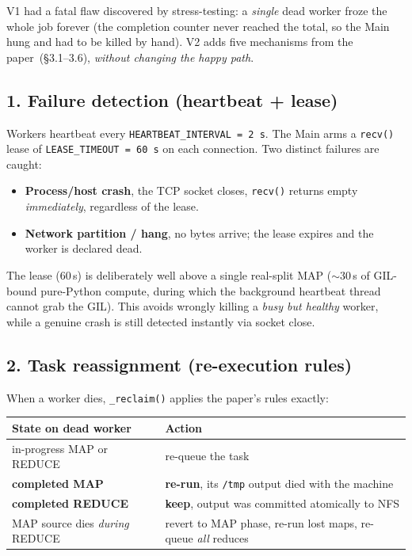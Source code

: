\documentclass[11pt,a4paper]{article}
\newcommand{\code}[1]{\texttt{\small #1}}
\begin{document}
V1 had a fatal flaw discovered by stress-testing: a \emph{single} dead worker
froze the whole job forever (the completion counter never reached the total, so
the Main hung and had to be killed by hand). V2 adds five mechanisms from the
paper~(\S3.1–3.6), \emph{without changing the happy path}.

\subsection{1. Failure detection (heartbeat + lease)}

Workers heartbeat every \code{HEARTBEAT\_INTERVAL = 2\,s}. The Main arms a
\code{recv()} lease of \code{LEASE\_TIMEOUT = 60\,s} on each connection. Two
distinct failures are caught:
\begin{itemize}
\item \textbf{Process/host crash}, the TCP socket closes, \code{recv()} returns
empty \emph{immediately}, regardless of the lease.
\item \textbf{Network partition / hang}, no bytes arrive; the lease expires and
the worker is declared dead.
\end{itemize}
The lease (60\,s) is deliberately well above a single real-split MAP
($\sim$30\,s of GIL-bound pure-Python compute, during which the background
heartbeat thread cannot grab the GIL). This avoids wrongly killing a
\emph{busy but healthy} worker, while a genuine crash is still detected
instantly via socket close.

\subsection{2. Task reassignment (re-execution rules)}

When a worker dies, \code{\_reclaim()} applies the paper's rules exactly:

\begin{table}[H]
\centering
\small
\renewcommand{\arraystretch}{1.25}
\begin{tabularx}{\textwidth}{@{}lX@{}}
\toprule
\textbf{State on dead worker} & \textbf{Action}\\
\midrule
in-progress MAP or REDUCE & re-queue the task\\
\textbf{completed MAP} & \textbf{re-run}, its \code{/tmp} output died with the machine\\
\textbf{completed REDUCE} & \textbf{keep}, output was committed atomically to NFS\\
MAP source dies \emph{during} REDUCE & revert to MAP phase, re-run lost maps, re-queue \emph{all} reduces\\
\bottomrule
\end{tabularx}
\end{table}
\end{document}
